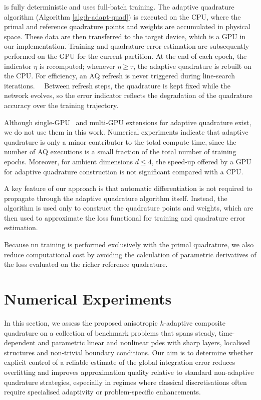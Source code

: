 \documentclass[oneside,reqno,11pt,a4paper]{amsart}
\theoremstyle{definition}
\begin{document}
 is fully deterministic and uses full-batch
training. The adaptive quadrature algorithm (Algorithm
\ref{alg:h-adapt-quad}) is executed on the CPU, where the primal and reference
quadrature points and weights are accumulated in physical space. These data are
then transferred to the target device, which is a GPU in our implementation.
Training and quadrature-error estimation are subsequently performed on the GPU
for the current partition. At the end of each epoch, the indicator $\eta$ is
recomputed; whenever $\eta \ge \tau$, the adaptive quadrature is rebuilt on the
CPU. For efficiency, an AQ refresh is never triggered during line-search
iterations. ~\
Between refresh steps, the quadrature is kept fixed while the network evolves, so the error indicator reflects the degradation of the quadrature accuracy over the training trajectory.

Although single-GPU~\cite{Pagani2021} and multi-GPU
\cite{tonarelli2025AQmultigpu} extensions for adaptive quadrature exist, we do
not use them in this work. Numerical experiments indicate that adaptive
quadrature is only a minor contributor to the total compute time, since the
number of AQ executions is a small fraction of the total number of training
epochs. Moreover, for ambient dimensions $d \leq 4$, the speed-up offered by a
GPU for adaptive quadrature construction is not significant compared with a
CPU.

A key feature of our approach is that automatic differentiation is not required to propagate
through the adaptive quadrature algorithm itself.
Instead, the algorithm is used only to construct the quadrature points and
weights, which are then used to approximate the loss functional for training
and quadrature error estimation.

Because \ac{nn} training is performed exclusively with the primal
quadrature, we also reduce computational cost by avoiding the calculation of
parametric derivatives of the loss evaluated on the richer reference
quadrature.

\section{Numerical Experiments}\label{sec:numexps}

In this section, we assess the proposed anisotropic $h$-adaptive composite
quadrature on a collection of benchmark problems that spans steady, time-dependent and parametric linear and nonlinear
\acp{pde} with sharp layers, localised structures and non-trivial boundary
conditions. Our aim is to determine whether explicit control of a reliable
estimate of the global integration error reduces overfitting and improves
approximation quality relative to standard non-adaptive quadrature strategies,
especially in regimes where classical discretisations often require
specialised adaptivity or problem-specific enhancements.
\end{document}
